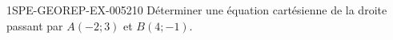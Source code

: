 \begin{exercice}{1SPE-GEOREP-EX-005}{2}{10}
Déterminer une équation cartésienne de la droite passant par $A(-2 ; 3)$ et $B(4 ; -1)$.
\end{exercice}

